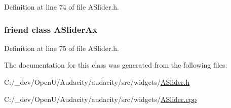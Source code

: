 Definition at line 74 of file A\+Slider.\+h.

\subsubsection[{\texorpdfstring{A\+Slider\+Ax}{ASliderAx}}]{\setlength{\rightskip}{0pt plus 5cm}friend class A\+Slider\+Ax\hspace{0.3cm}{\ttfamily [friend]}}\hypertarget{class_l_w_slider_a2167247864d69763e5d637b4d62ccd88}{}\label{class_l_w_slider_a2167247864d69763e5d637b4d62ccd88}


Definition at line 75 of file A\+Slider.\+h.



The documentation for this class was generated from the following files\+:\begin{DoxyCompactItemize}
\item 
C\+:/\+\_\+dev/\+Open\+U/\+Audacity/audacity/src/widgets/\hyperlink{_a_slider_8h}{A\+Slider.\+h}\item 
C\+:/\+\_\+dev/\+Open\+U/\+Audacity/audacity/src/widgets/\hyperlink{_a_slider_8cpp}{A\+Slider.\+cpp}\end{DoxyCompactItemize}
